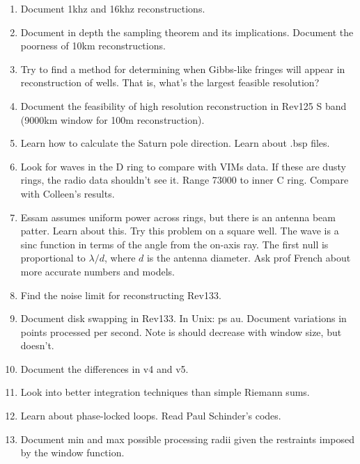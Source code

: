 \documentclass[crop=false,class=article,oneside]{standalone}
\begin{document}
\begin{enumerate}
            \item Document 1khz and 16khz reconstructions.
            \item Document in depth the sampling theorem and its
                  implications. Document the poorness of 10km
                  reconstructions.
            \item Try to find a method for determining when Gibbs-like
                  fringes will appear in reconstruction of wells. That is,
                  what's the largest feasible resolution?
            \item Document the feasibility of high resolution
                  reconstruction in Rev125 S band
                  (9000km window for 100m reconstruction).
            \item Learn how to calculate the Saturn pole direction.
                  Learn about .bsp files.
            \item Look for waves in the D ring to compare with VIMs data.
                  If these are dusty rings, the radio data shouldn't
                  see it. Range 73000 to inner C ring. Compare with
                  Colleen's results.
            \item Essam assumes uniform power across rings, but there is
                  an antenna beam patter. Learn about this. Try this
                  problem on a square well. The wave is a sinc function
                  in terms of the angle from the on-axis ray.
                  The first null is proportional to $\lambda/d$, where
                  $d$ is the antenna diameter. Ask prof French about
                  more accurate numbers and models.
            \item Find the noise limit for reconstructing Rev133.
            \item Document disk swapping in Rev133. In Unix: ps au.
                  Document variations in points processed per second.
                  Note is should decrease with window size, but
                  doesn't.
            \item Document the differences in v4 and v5.
            \item Look into better integration techniques than simple
                  Riemann sums.
            \item Learn about phase-locked loops. Read Paul Schinder's
                  codes.
            \item Document min and max possible processing radii given
                  the restraints imposed by the window function.

\end{enumerate}
\end{document}
